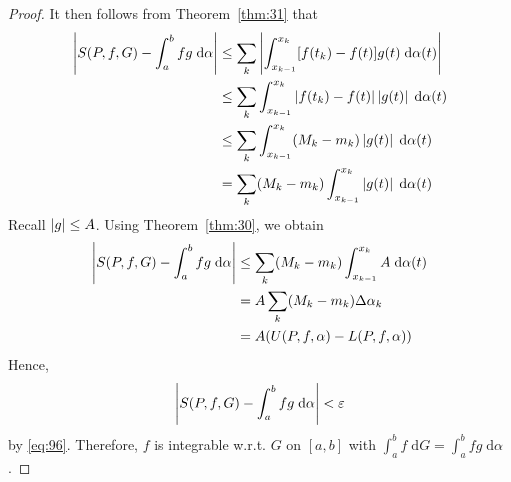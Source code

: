 \documentclass[thmcnt=section, 12pt]{my-elegantbook}
\begin{document}
\begin{proof}
    It then follows from Theorem~\ref{thm:31} that
    \begin{align*}
        \left\lvert S(P,f, G) - \int_{a}^{b} f g  \; \mathrm{d}\alpha \right\rvert
         & \leq \sum_k \left\lvert 
            \int_{x_{k-1}}^{x_k} [f(t_k) - f(t)] g(t) \; \mathrm{d}\alpha(t)
         \right\rvert                                                                                         \\
         & \leq \sum_k \int_{x_{k-1}}^{x_k} \left\lvert f(t_k) - f(t) \right\rvert \left\lvert g(t) \right\rvert \; \mathrm{d}\alpha(t) \\
         & \leq \sum_k \int_{x_{k-1}}^{x_k} (M_k - m_k) \left\lvert g(t) \right\rvert \; \mathrm{d}\alpha(t)         \\
         & = \sum_k (M_k - m_k) \int_{x_{k-1}}^{x_k} \left\lvert g(t) \right\rvert \; \mathrm{d}\alpha(t)
    \end{align*}
    Recall $\left\lvert g \right\rvert \leq A$. Using Theorem~\ref{thm:30}, we obtain
    \begin{align*}
        \left\lvert S(P,f, G) - \int_{a}^{b} f g  \; \mathrm{d}\alpha \right\rvert
         & \leq \sum_k (M_k - m_k) \int_{x_{k-1}}^{x_k} A \; \mathrm{d}\alpha(t) \\
         & = A \sum_k (M_k - m_k) \Delta\alpha_k                                 \\
         & = A (U(P,f,\alpha) - L(P,f,\alpha))
    \end{align*}
    Hence,
    \begin{align*}
        \left\lvert S(P,f,G) - \int_{a}^{b} f g  \; \mathrm{d}\alpha \right\rvert < \varepsilon
    \end{align*}
    by \eqref{eq:96}. Therefore, $f$ is integrable w.r.t. $G$ on $[a, b]$ with $\int_{a}^{b} f \; \mathrm{d}G = \int_{a}^{b} f g  \; \mathrm{d}\alpha$.
\end{proof}
\end{document}
